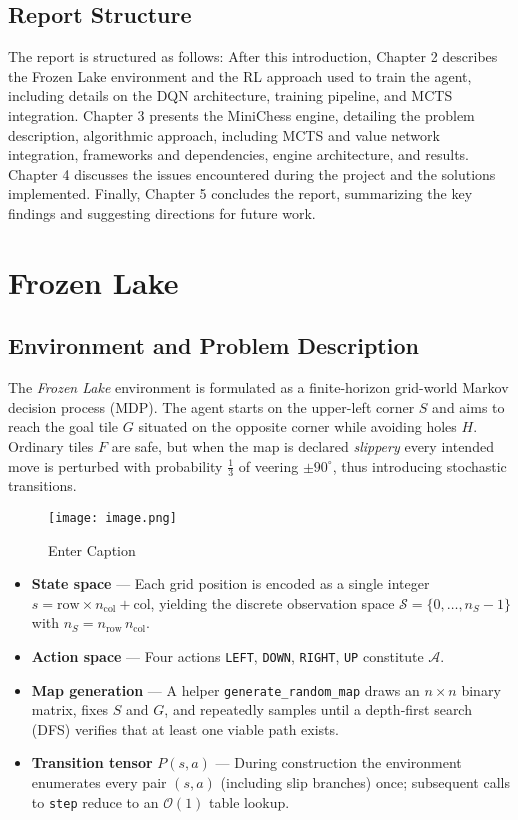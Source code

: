 \documentclass{report}
\begin{document}
\section{Report Structure}
The report is structured as follows: After this introduction, Chapter 2 describes the Frozen Lake environment and the RL approach used to train the agent, including details on the DQN architecture, training pipeline, and MCTS integration. Chapter 3 presents the MiniChess engine, detailing the problem description, algorithmic approach, including MCTS and value network integration, frameworks and dependencies, engine architecture, and results. Chapter 4 discusses the issues encountered during the project and the solutions implemented. Finally, Chapter 5 concludes the report, summarizing the key findings and suggesting directions for future work.

\chapter{Frozen Lake}
\section{Environment and Problem Description}
The \emph{Frozen Lake} environment is formulated as a finite-horizon grid-world Markov decision process (MDP). The agent starts on the upper-left corner $S$ and aims to reach the goal tile $G$ situated on the opposite corner while avoiding holes $H$. Ordinary tiles $F$ are safe, but when the map is declared \emph{slippery} every intended move is perturbed with probability $\tfrac{1}{3}$ of veering $\pm 90^{\circ}$, thus introducing stochastic transitions.
 
\begin{figure}[h!]
    \centering
\texttt{[image: image.png]}
    \caption{Enter Caption}
    \label{fig:enter-label}
\end{figure}
 
\begin{itemize}
  \item \textbf{State space} — Each grid position is encoded as a single integer $s = \text{row} \times n_{\text{col}} + \text{col}$, yielding the discrete observation space $\mathcal{S}=\{0, \dots, n_S-1\}$ with $n_S = n_{\text{row}}\, n_{\text{col}}$.
  \item \textbf{Action space} — Four actions \texttt{LEFT}, \texttt{DOWN}, \texttt{RIGHT}, \texttt{UP} constitute $\mathcal{A}$.
  \item \textbf{Map generation} — A helper \texttt{generate\_random\_map} draws an $n\times n$ binary matrix, fixes $S$ and $G$, and repeatedly samples until a depth‑first search (DFS) verifies that at least one viable path exists.
  \item \textbf{Transition tensor} $P(s,a)$ — During construction the environment enumerates every pair $(s,a)$ (including slip branches) once; subsequent calls to \texttt{step} reduce to an $\mathcal{O}(1)$ table lookup.
\end{itemize}
 
\end{document}
